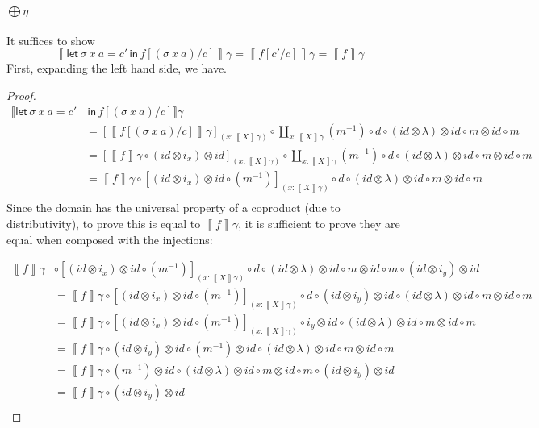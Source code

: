 \documentclass[acmsmall,nonacm]{acmart}
\newcommand{\sem}[1]{\left\llbracket{#1}\right\rrbracket}
\newcommand{\semg}[1]{\sem{#1}\gamma}
\newcommand{\letin}[3]{\mathsf{let}\, #1 = #2 \, \mathsf{in}\, #3}
\begin{document}
\paragraph{$\bigoplus\eta$}
It suffices to show
\[
  \semg{\letin {\sigma~x~a} {c'} {f[(\sigma~x~a)/c]}} = \semg{f[c'/c]} = \semg{f}
  \]
First, expanding the left hand side, we have.
\begin{proof}
  \begin{align*}
    \llbracket \mathsf{let}\, {\sigma~x~a} = {c'} & \, \mathsf{in}\, {f[(\sigma~x~a)/c]} \rrbracket \gamma \\
    &= [ \semg{f[(\sigma~x~a)/c]} ]_{(x : \semg{X})} \circ \coprod_{x:\semg{X}}(m^{-1}) \circ d \circ (id \otimes \lambda) \otimes id \circ m \otimes id \circ m\\
    &= [ \semg{f} \circ (id \otimes i_x) \otimes id ]_{(x : \semg{X})} \circ \coprod_{x:\semg{X}}(m^{-1}) \circ d \circ (id \otimes \lambda) \otimes id \circ m \otimes id \circ m\\
    &= \semg{f} \circ [ (id \otimes i_x) \otimes id \circ (m^{-1})]_{(x : \semg{X})} \circ d \circ (id \otimes \lambda) \otimes id \circ m \otimes id \circ m\\
  \end{align*}
Since the domain has the universal property of a coproduct (due to distributivity), to prove
this is equal to $\semg{f}$, it is sufficient to prove they are equal
when composed with the injections:

\begin{align*}
  \semg{f} &\circ [ (id \otimes i_x) \otimes id \circ (m^{-1})]_{(x : \semg{X})} \circ d \circ (id \otimes \lambda) \otimes id \circ m \otimes id \circ m \circ (id \otimes i_y) \otimes id\\
  &= \semg{f} \circ [ (id \otimes i_x) \otimes id \circ (m^{-1})]_{(x : \semg{X})} \circ d  \circ (id \otimes i_y) \otimes id \circ (id \otimes \lambda) \otimes id \circ m \otimes id \circ m \tag{naturality}\\
  &= \semg{f} \circ [ (id \otimes i_x) \otimes id \circ (m^{-1})]_{(x : \semg{X})} \circ i_y \otimes id \circ (id \otimes \lambda) \otimes id \circ m \otimes id \circ m \tag{naturality}\\
  &= \semg{f} \circ (id \otimes i_y) \otimes id \circ (m^{-1}) \otimes id \circ (id \otimes \lambda) \otimes id \circ m \otimes id \circ m \\
  &= \semg{f} \circ (m^{-1}) \otimes id \circ (id \otimes \lambda) \otimes id \circ m \otimes id \circ m \circ (id \otimes i_y) \otimes id \\
  &= \semg{f} \circ (id \otimes i_y) \otimes id \tag{coherence}\\
\end{align*}
\end{proof}
\end{document}
